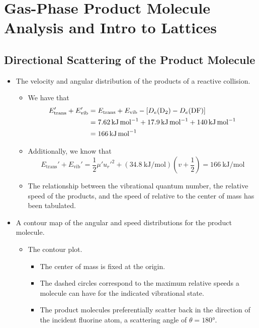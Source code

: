 \documentclass[../notes.tex]{subfiles}
\begin{document}
\chapter{Gas-Phase Product Molecule Analysis and Intro to Lattices}
\section{Directional Scattering of the Product Molecule}
\begin{itemize}
    \item {}The velocity and angular distribution of the products of a reactive collision.
    \begin{itemize}
        \item We have that
        \begin{align*}
            E_\text{trans}'+E_\text{vib}' &= E_\text{trans}+E_\text{vib}-[D_e(\ce{D2})-D_e(\ce{DF})]\\
            &= \SI{7.62}{\kilo\joule\per\mole}+\SI{17.9}{\kilo\joule\per\mole}+\SI{140}{\kilo\joule\per\mole}\\
            &= \SI{166}{\kilo\joule\per\mole}
        \end{align*}
        \item Additionally, we know that
        \begin{equation*}
            E_\text{trans}'+E_\text{vib}' = \frac{1}{2}\mu'u_r'^2+(\SI{34.8}{\kilo\joule\per\mole})\left( v+\frac{1}{2} \right)
            = \SI{166}{\kilo\joule\per\mole}
        \end{equation*}
        \item The relationship between the vibrational quantum number, the relative speed of the products, and the speed of  relative to the center of mass has been tabulated.
    \end{itemize}
    \item A contour map of the angular and speed distributions for the product molecule.
    \begin{itemize}
        \item The contour plot.
        \begin{itemize}
            \item The center of mass is fixed at the origin.
            \item The dashed circles correspond to the maximum relative speeds a  molecule can have for the indicated vibrational state.
            \item The product molecules preferentially scatter back in the direction of the incident fluorine atom, a scattering angle of $\theta=\ang{180}$.

\end{itemize}
\end{itemize}
\end{itemize}
\end{document}
